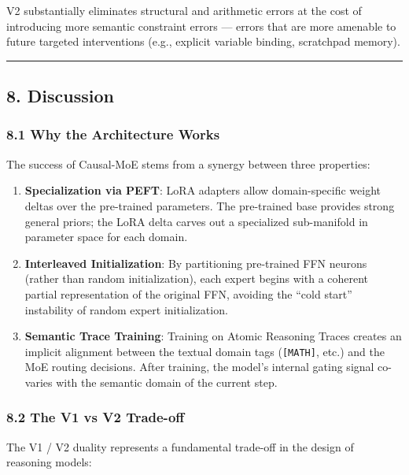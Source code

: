V2 substantially eliminates structural and arithmetic errors at the cost
of introducing more semantic constraint errors --- errors that are more
amenable to future targeted interventions (e.g., explicit variable
binding, scratchpad memory).

\begin{center}\rule{0.5\linewidth}{0.5pt}\end{center}

\subsection{8. Discussion}\label{discussion}

\subsubsection{8.1 Why the Architecture
Works}\label{why-the-architecture-works}

The success of Causal-MoE stems from a synergy between three properties:

\begin{enumerate}
\def\labelenumi{\arabic{enumi}.}
\item
  \textbf{Specialization via PEFT}: LoRA adapters allow domain-specific
  weight deltas over the pre-trained parameters. The pre-trained base
  provides strong general priors; the LoRA delta carves out a
  specialized sub-manifold in parameter space for each domain.
\item
  \textbf{Interleaved Initialization}: By partitioning pre-trained FFN
  neurons (rather than random initialization), each expert begins with a
  coherent partial representation of the original FFN, avoiding the
  ``cold start'' instability of random expert initialization.
\item
  \textbf{Semantic Trace Training}: Training on Atomic Reasoning Traces
  creates an implicit alignment between the textual domain tags
  (\texttt{{[}MATH{]}}, etc.) and the MoE routing decisions. After
  training, the model's internal gating signal co-varies with the
  semantic domain of the current step.
\end{enumerate}

\subsubsection{8.2 The V1 vs V2 Trade-off}\label{the-v1-vs-v2-trade-off}

The V1 / V2 duality represents a fundamental trade-off in the design of
reasoning models:


